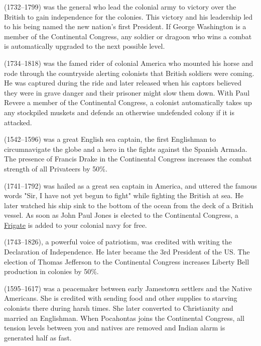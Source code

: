 \documentclass[12pt]{article}
\begin{document}
 (1732--1799) was the general who lead the
colonial army to victory over the British to gain independence for the
colonies. This victory and his leadership led to his being named the
new nation's first President. If George Washington is a member of the
Continental Congress, any soldier or dragoon who wins a combat is
automatically upgraded to the next possible
level. 

 (1734--1818) was the famed rider of colonial
America who mounted his horse and rode through the countryside
alerting colonists that British soldiers were coming. He was captured
during the ride and later released when his captors believed they were
in grave danger and their prisoner might slow them down. With Paul
Revere a member of the Continental Congress, a colonist automatically
takes up any stockpiled muskets and defends an otherwise undefended
colony if it is attacked. 

 (1542--1596) was a great English sea captain,
the first Englishman to circumnavigate the globe and a hero in the
fights against the Spanish Armada. The presence of Francis Drake in
the Continental Congress increases the combat strength of all
Privateers by 50\%. 

 (1741--1792) was hailed as a great sea
captain in America, and uttered the famous words "Sir, I have not yet
begun to fight" while fighting the British at sea. He later watched
his ship sink to the bottom of the ocean from the deck of a British
vessel. As soon as John Paul Jones is elected to the Continental
Congress, a \hyperlink{Frigate}{Frigate} is added to your colonial
navy for free. 

 (1743--1826), a powerful voice of
patriotism, was credited with writing the Declaration of
Independence. He later became the 3rd President of the US. The
election of Thomas Jefferson to the Continental Congress increases
Liberty Bell production in colonies by
50\%. 

 (1595--1617) was a peacemaker between early
Jamestown settlers and the Native Americans. She is credited with
sending food and other supplies to starving colonists there during
harsh times.  She later converted to Christianity and married an
Englishman.  When Pocahontas joins the Continental Congress, all
tension levels between you and natives are removed and Indian alarm is
generated half as fast. 
\end{document}
